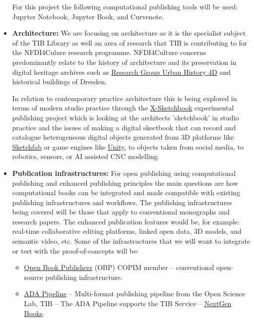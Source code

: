\documentclass{article}
\begin{document}
\begin{itemize}
For this project the following computational publishing tools will be used: Jupyter Notebook, Jupyter Book, and Curvenote.


\item \textbf{Architecture:} We are focusing on architecture as it is the specialist subject of the TIB Library as well an area of research that TIB is contributing to for the NFDI4Culure research programme. NFDI4Culture concerns predominantly relate to the history of architecture and its preservation in digital heritage archives such as \href{http://www.urbanhistory4d.org/wordpress/}{Research Group Urban History 4D} and historical buildings of Dresden. 


In relation to contemporary practice architecture this is being explored in terms of modern studio practice through the \href{https://tibhannover.github.io/xsketch/}{X-Sketchbook} experimental publishing project which is looking at the architects 'sketchbook' in studio practice and the issues of making a digital skectbook that can record and catalogue heterogeneous digital objects generated from 3D platforms like \href{https://sketchfab.com/}{Sketchfab} or game engines like \href{https://unity.com/}{Unity}, to objects taken from social media, to robotics, sensors, or AI assisted CNC modelling.  


\item \textbf{Publication infrastructures:} For open publishing using computational publishing and enhanced publishing principles the main questions are how computational books can be integrated and made compatible with existing publishing infrastructures and workflows. The publishing infrastructures being covered will be those that apply to conventional monographs and research papers. The enhanced publication features would be, for example: real-time collaborative editing platforms, linked open data, 3D models, and semantic video, etc. Some of the infrastructures that we will want to integrate or test with the proof-of-concepts will be: 

\begin{itemize}
\item \href{https://github.com/OpenBookPublishers}{Open Book Publishers} (OBP) COPIM member – conventional open-source publishing infrastructure.


\item \href{https://github.com/TIBHannover/ADA}{ADA Pipeline} – Multi-format publishing pipeline from the Open Science Lab, TIB – The ADA Pipeline supports the TIB Service – \href{https://projects.tib.eu/nextgen-books/en/}{NextGen Books}.



\end{itemize}
\end{itemize}
\end{document}
